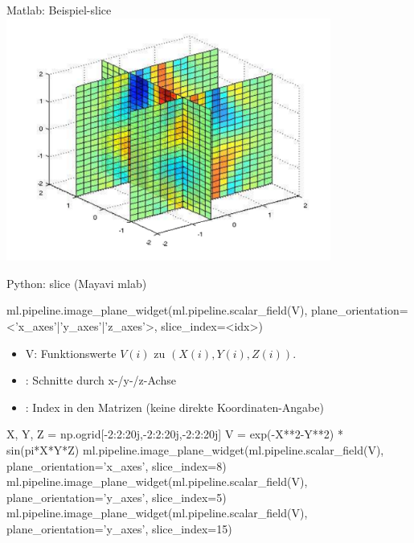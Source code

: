 \documentclass[hyperref={xetex}]{beamer}
\begin{document}
\begin{frame}[fragile]{Matlab: Beispiel-slice}
\hfil\includegraphics[width=0.8\textwidth]{figures/slice}\hfil
\end{frame}

\begin{frame}[fragile]{Python: slice (Mayavi mlab)}
  \begin{pyin}
ml.pipeline.image_plane_widget(ml.pipeline.scalar_field(V), plane_orientation=<'x_axes'|'y_axes'|'z_axes'>, slice_index=<idx>)    
  \end{pyin}
  \begin{itemize}
    \item V: Funktionswerte $V(i)$ zu $(X(i),Y(i),Z(i))$.
    \item {}: Schnitte durch x-/y-/z-Achse
    \item {}: Index in den Matrizen (keine direkte Koordinaten-Angabe)
  \end{itemize}

  \begin{pyin}
X, Y, Z = np.ogrid[-2:2:20j,-2:2:20j,-2:2:20j]
V = exp(-X**2-Y**2) * sin(pi*X*Y*Z)
ml.pipeline.image_plane_widget(ml.pipeline.scalar_field(V), plane_orientation='x_axes', slice_index=8)
ml.pipeline.image_plane_widget(ml.pipeline.scalar_field(V), plane_orientation='y_axes', slice_index=5)
ml.pipeline.image_plane_widget(ml.pipeline.scalar_field(V), plane_orientation='y_axes', slice_index=15)    
  \end{pyin}

\end{frame}
\end{document}
